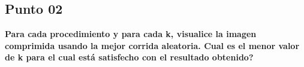 \subsection*{Punto 02}

\textbf{Para cada procedimiento y para cada k, visualice la imagen comprimida usando la mejor corrida aleatoria. Cual es el menor valor de k para el cual está satisfecho con el resultado obtenido?}